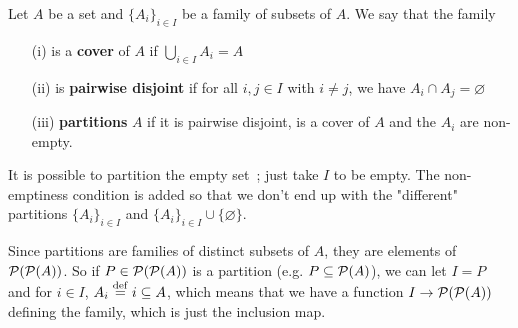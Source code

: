 \begin{definition} %
	Let $A$ be a set and $\{A_i\}_{i \in I}$ be a family of subsets of $A$. We say that the family 
	\\
	\begin{itemize}
		\item[(i)] is a \textbf{cover} of $A$ if $\bigcup_{i \in I} A_i = A$
		\\

		\item[(ii)] is \textbf{pairwise disjoint} if for all $i,j \in I$ with $i \neq j$, we have $A_i \cap A_j = \varnothing$
		\\

		\item[(iii)] \textbf{partitions} $A$ if it is pairwise disjoint, is a cover of $A$ and the $A_i$ are non-empty.
		\\

	\end{itemize}
\end{definition}

\begin{remark} \label{why-partition-sets-are-non-empty}
	It is possible to partition the empty set~; just take $I$ to be empty. The non-emptiness condition is added so that we don't end up with the "different" partitions $\{A_i\}_{i \in I}$ and $\{A_i\}_{i \in I} \cup \{\varnothing\}$. 
\end{remark}

\begin{remark} \label{partition-as-a-family-of-subsets}
	Since partitions are families of distinct subsets of $A$, they are elements of $\operatorname{\mathcal P}(\operatorname{\mathcal P}(A))$. So if $P \in \operatorname{\mathcal P}(\operatorname{\mathcal P}(A))$ is a partition (e.g. $P \subseteq \operatorname{\mathcal P}(A)$), we can let $I = P$ and for $i \in I$, $A_i \overset{\mathrm{def}}{=} i \subseteq A$, which means that we have a function $I \to \operatorname{\mathcal P}(\operatorname{\mathcal P}(A))$ defining the family, which is just the inclusion map.
\end{remark}

